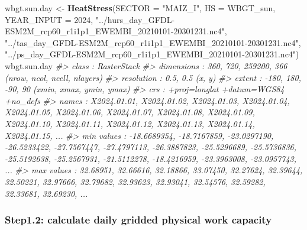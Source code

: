 \documentclass[
]{article}
\newenvironment{Shaded}{\begin{snugshade}}{\end{snugshade}}
\newcommand{\AttributeTok}[1]{\textcolor[rgb]{0.13,0.29,0.53}{#1}}
\newcommand{\CommentTok}[1]{\textcolor[rgb]{0.56,0.35,0.01}{\textit{#1}}}
\newcommand{\DecValTok}[1]{\textcolor[rgb]{0.00,0.00,0.81}{#1}}
\newcommand{\FunctionTok}[1]{\textcolor[rgb]{0.13,0.29,0.53}{\textbf{#1}}}
\newcommand{\NormalTok}[1]{#1}
\newcommand{\OtherTok}[1]{\textcolor[rgb]{0.56,0.35,0.01}{#1}}
\newcommand{\StringTok}[1]{\textcolor[rgb]{0.31,0.60,0.02}{#1}}
\begin{document}
\begin{Shaded}
\begin{Highlighting}[]
\NormalTok{wbgt.sun.day }\OtherTok{\textless{}{-}} \FunctionTok{HeatStress}\NormalTok{(}\AttributeTok{SECTOR =} \StringTok{"MAIZ\_I"}\NormalTok{, }\AttributeTok{HS =}\NormalTok{ WBGT\_sun, }\AttributeTok{YEAR\_INPUT =} \DecValTok{2024}\NormalTok{,}
                    \StringTok{"../hurs\_day\_GFDL{-}ESM2M\_rcp60\_r1i1p1\_EWEMBI\_20210101{-}20301231.nc4"}\NormalTok{,}
                    \StringTok{"../tas\_day\_GFDL{-}ESM2M\_rcp60\_r1i1p1\_EWEMBI\_20210101{-}20301231.nc4"}\NormalTok{,}
                    \StringTok{"../ps\_day\_GFDL{-}ESM2M\_rcp60\_r1i1p1\_EWEMBI\_20210101{-}20301231.nc4"}\NormalTok{)}
\NormalTok{wbgt.sun.day}
\CommentTok{\#\textgreater{} class      : RasterStack }
\CommentTok{\#\textgreater{} dimensions : 360, 720, 259200, 366  (nrow, ncol, ncell, nlayers)}
\CommentTok{\#\textgreater{} resolution : 0.5, 0.5  (x, y)}
\CommentTok{\#\textgreater{} extent     : {-}180, 180, {-}90, 90  (xmin, xmax, ymin, ymax)}
\CommentTok{\#\textgreater{} crs        : +proj=longlat +datum=WGS84 +no\_defs }
\CommentTok{\#\textgreater{} names      : X2024.01.01, X2024.01.02, X2024.01.03, X2024.01.04, X2024.01.05, X2024.01.06, X2024.01.07, X2024.01.08, X2024.01.09, X2024.01.10, X2024.01.11, X2024.01.12, X2024.01.13, X2024.01.14, X2024.01.15, ... }
\CommentTok{\#\textgreater{} min values : {-}18.6689354, {-}18.7167859, {-}23.0297190, {-}26.5233422, {-}27.7567447, {-}27.4797113, {-}26.3887823, {-}25.5296689, {-}25.5736836, {-}25.5192638, {-}25.2567931, {-}21.5112278, {-}18.4216959, {-}23.3963008, {-}23.0957743, ... }
\CommentTok{\#\textgreater{} max values :    32.68951,    32.66616,    32.18866,    33.07450,    32.27624,    32.39644,    32.50221,    32.97666,    32.79682,    32.93623,    32.93041,    32.54576,    32.59282,    32.33681,    32.69230, ...}
\end{Highlighting}
\end{Shaded}

\subsubsection{Step1.2: calculate daily gridded physical work
capacity}\label{step1.2-calculate-daily-gridded-physical-work-capacity}
\end{document}
